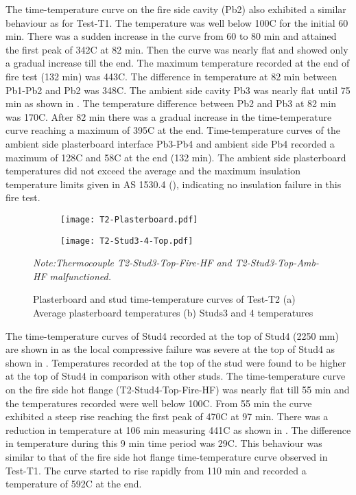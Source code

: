 The time-temperature curve on the fire side cavity (Pb2) also exhibited a similar behaviour as for Test-T1. The temperature was well below 100\degree C for the initial 60 min. There was a sudden increase in the curve from 60 to 80 min and attained the first peak of 342\degree C at 82 min. Then the curve was nearly flat and showed only a gradual increase till the end. The maximum temperature recorded at the end of fire test (132 min) was 443\degree C. The difference in temperature at 82 min between Pb1-Pb2 and Pb2 was 348\degree C. The ambient side cavity Pb3 was nearly flat until 75 min as shown in . The temperature difference between Pb2 and Pb3 at 82 min was 170\degree C. After 82 min there was a gradual increase in the time-temperature curve reaching a maximum of 395\degree C at the end. Time-temperature curves of the ambient side plasterboard interface Pb3-Pb4 and ambient side Pb4 recorded a maximum of 128\degree C and 58\degree C at the end (132 min). The ambient side plasterboard temperatures did not exceed the average and the maximum insulation temperature limits given in AS 1530.4 (\cite{StandardsAustral2014}), indicating no insulation failure in this fire test.
\begin{figure}[!htbp]
	\centering
	\begin{subfigure}[b]{0.7\textwidth}
		\centering
		\texttt{[image: T2-Plasterboard.pdf]}
		\caption{}
		\label{subfig:T2-Plasterboard}
	\end{subfigure}
	\begin{subfigure}[b]{0.7\textwidth}
		\centering
		\texttt{[image: T2-Stud3-4-Top.pdf]}
		\caption{}
		\label{subfig:T2-Stud3-4-Top}
	\end{subfigure}
	   \caption{Plasterboard and stud time-temperature curves of Test-T2 (a) Average plasterboard temperatures (b) Studs3 and 4 temperatures}
	   \label{fig:T2-PB-Stud}
	   \fontsize{10}{1}\textit{Note:Thermocouple T2-Stud3-Top-Fire-HF and T2-Stud3-Top-Amb-HF malfunctioned.}
\end{figure}

The time-temperature curves of Stud4 recorded at the top of Stud4 (2250 mm) are shown in  as the local compressive failure was severe at the top of Stud4 as shown in . Temperatures recorded at the top of the stud were found to be higher at the top of Stud4 in comparison with other studs. The time-temperature curve on the fire side hot flange (T2-Stud4-Top-Fire-HF) was nearly flat till 55 min and the temperatures recorded were well below 100\degree C. From 55 min the curve exhibited a steep rise reaching the first peak of 470\degree C at 97 min. There was a reduction in temperature at 106 min measuring 441\degree C as shown in . The difference in temperature during this 9 min time period was 29\degree C. This behaviour was similar to that of the fire side hot flange time-temperature curve observed in Test-T1. The curve started to rise rapidly from 110 min and recorded a temperature of 592\degree C at the end. 

